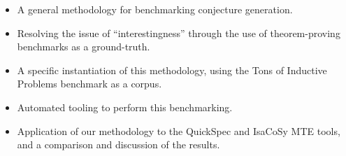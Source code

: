 \documentclass[]{default}
\begin{document}
\begin{itemize}
\item A general methodology for benchmarking conjecture generation.
\item Resolving the issue of ``interestingness'' through the use of
  theorem-proving benchmarks as a ground-truth.
\item A specific instantiation of this methodology, using the Tons of Inductive
  Problems benchmark as a corpus.
\item Automated tooling to perform this benchmarking.
\item Application of our methodology to the QuickSpec and IsaCoSy MTE tools,
  and a comparison and discussion of the results.
\end{itemize}




\end{document}
